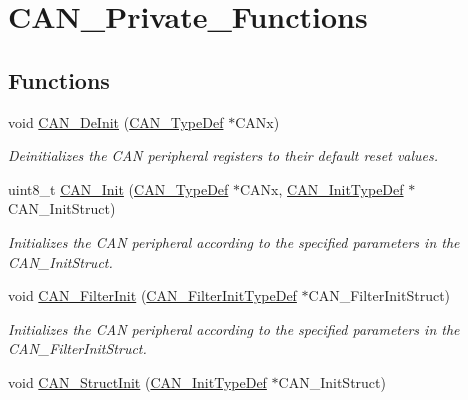 \hypertarget{group___c_a_n___private___functions}{}\section{C\+A\+N\+\_\+\+Private\+\_\+\+Functions}
\label{group___c_a_n___private___functions}
\subsection*{Functions}
\begin{DoxyCompactItemize}
\item 
void \mbox{\hyperlink{group___c_a_n___private___functions_ga002b74cd69574a14b17ad445090245cd}{C\+A\+N\+\_\+\+De\+Init}} (\mbox{\hyperlink{struct_c_a_n___type_def}{C\+A\+N\+\_\+\+Type\+Def}} $\ast$C\+A\+Nx)
\begin{DoxyCompactList}\small\item\em Deinitializes the C\+AN peripheral registers to their default reset values. \end{DoxyCompactList}\item 
uint8\+\_\+t \mbox{\hyperlink{group___c_a_n___private___functions_ga9023c35a9ab931ad4513fc5d19b4bd6c}{C\+A\+N\+\_\+\+Init}} (\mbox{\hyperlink{struct_c_a_n___type_def}{C\+A\+N\+\_\+\+Type\+Def}} $\ast$C\+A\+Nx, \mbox{\hyperlink{struct_c_a_n___init_type_def}{C\+A\+N\+\_\+\+Init\+Type\+Def}} $\ast$C\+A\+N\+\_\+\+Init\+Struct)
\begin{DoxyCompactList}\small\item\em Initializes the C\+AN peripheral according to the specified parameters in the C\+A\+N\+\_\+\+Init\+Struct. \end{DoxyCompactList}\item 
void \mbox{\hyperlink{group___c_a_n___private___functions_ga39476830280340363c51041be6b12647}{C\+A\+N\+\_\+\+Filter\+Init}} (\mbox{\hyperlink{struct_c_a_n___filter_init_type_def}{C\+A\+N\+\_\+\+Filter\+Init\+Type\+Def}} $\ast$C\+A\+N\+\_\+\+Filter\+Init\+Struct)
\begin{DoxyCompactList}\small\item\em Initializes the C\+AN peripheral according to the specified parameters in the C\+A\+N\+\_\+\+Filter\+Init\+Struct. \end{DoxyCompactList}\item 
void \mbox{\hyperlink{group___c_a_n___private___functions_gad77ad810868ed111755fc9e8ae0c7646}{C\+A\+N\+\_\+\+Struct\+Init}} (\mbox{\hyperlink{struct_c_a_n___init_type_def}{C\+A\+N\+\_\+\+Init\+Type\+Def}} $\ast$C\+A\+N\+\_\+\+Init\+Struct)

\end{DoxyCompactItemize}
